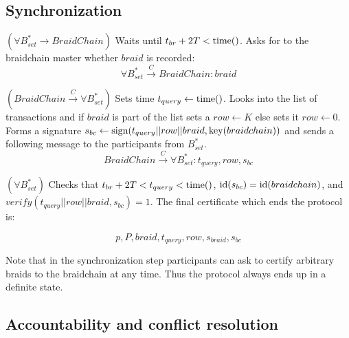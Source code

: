 \documentclass[12pt]{article}
\begin{document}
\subsection*{Synchronization}

\begin{steps}

\item $(\forall B^*_{set} \to BraidChain)$ Waits until $t_{br} + 2T < {\rm time}()$. Asks for to the braidchain master whether $braid$ is recorded:
  \begin{equation}
    \forall B^*_{set} \overset{C}{\to} BraidChain: braid
  \end{equation}
  

\item $(BraidChain \overset{C}{\to} \forall B^*_{set})$ Sets time $t_{query} \leftarrow {\rm time}()$. Looks into the list of transactions and if $braid$ is part of the list sets a $row \leftarrow K$ else sets it $row \leftarrow 0$. Forms a signature $s_{bc} \leftarrow {\rm sign}(t_{query}||row||braid,{\rm key}(braidchain))$ and sends a following message to the participants from $B^*_{set}$.
  \begin{equation}
    BraidChain \overset{C}{\to} \forall B^*_{set}: t_{query}, row, s_{bc}
  \end{equation}
  
\item $(\forall B^*_{set})$ Checks that $t_{br} + 2T < t_{query} < {\rm time}()$, ${\rm id}(s_{bc}) = {\rm id}(braidchain)$, and \\ $verify(t_{query}||row||braid, s_{bc})=1$. The final certificate which ends the protocol is:

\begin{equation}
 p, P, braid, t_{query}, row, s_{braid}, s_{bc}
\end{equation}

\end{steps}

Note that in the synchronization step participants can ask to certify arbitrary braids to the braidchain at any time. Thus the protocol always ends up in a definite state. 

\subsection*{Accountability and conflict resolution}
\end{document}
